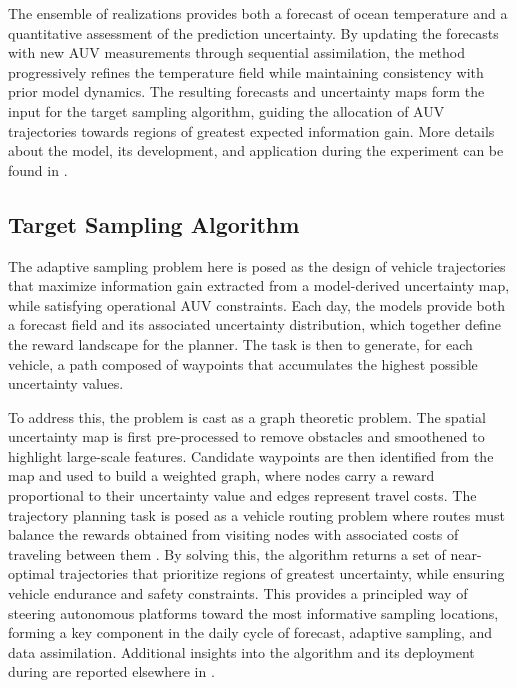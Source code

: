 The ensemble of realizations provides both a forecast of ocean
temperature and a quantitative assessment of the prediction
uncertainty.  By updating the forecasts with new AUV measurements
through sequential assimilation, the method progressively refines the
temperature field while maintaining consistency with prior model
dynamics. The resulting forecasts and uncertainty maps form the input
for the target sampling algorithm, guiding the allocation of AUV
trajectories towards regions of greatest expected information
gain. More details about the model, its development, and application
during the \proj experiment can be found in \cite{Duarte2025}.

\subsection{Target Sampling Algorithm}

The adaptive sampling problem here is posed as the design of vehicle
trajectories that maximize information gain
\cite{eidsvik2015,fossum18} extracted from a model-derived uncertainty
map, while satisfying operational AUV constraints. Each day, the
models provide both a forecast field and its associated uncertainty
distribution, which together define the reward landscape for the
planner. The task is then to generate, for each vehicle, a path
composed of waypoints that accumulates the highest possible
uncertainty values.

To address this, the problem is cast as a graph theoretic problem. The
spatial uncertainty map is first pre-processed to remove obstacles and
smoothened to highlight large-scale features. Candidate waypoints are
then identified from the map and used to build a weighted graph, where
nodes carry a reward proportional to their uncertainty value and edges
represent travel costs. The trajectory planning task is posed as a
vehicle routing problem where routes must balance the rewards obtained
from visiting nodes with associated costs of traveling between them
\cite{vidal2013,toth2014vehicle}. By solving this, the algorithm
returns a set of near-optimal trajectories that prioritize regions of
greatest uncertainty, while ensuring vehicle endurance and safety
constraints. This provides a principled way of steering autonomous
platforms toward the most informative sampling locations, forming a
key component in the daily cycle of forecast, adaptive sampling, and
data assimilation. Additional insights into the algorithm and its
deployment during \proj are reported elsewhere in
\cite{bernacchi2025}.

